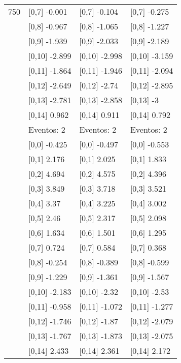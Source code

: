 \begin{table}
\begin{tabular}[t]{llll}
750 & {}[0,7] -0.001 & {}[0,7] -0.104 & {}[0,7] -0.275\\
\addlinespace
 & {}[0,8] -0.967 & {}[0,8] -1.065 & {}[0,8] -1.227\\
 & {}[0,9] -1.939 & {}[0,9] -2.033 & {}[0,9] -2.189\\
 & {}[0,10] -2.899 & {}[0,10] -2.998 & {}[0,10] -3.159\\
 & {}[0,11] -1.864 & {}[0,11] -1.946 & {}[0,11] -2.094\\
 & {}[0,12] -2.649 & {}[0,12] -2.74 & {}[0,12] -2.895\\
\addlinespace
 & {}[0,13] -2.781 & {}[0,13] -2.858 & {}[0,13] -3\\
 & {}[0,14] 0.962 & {}[0,14] 0.911 & {}[0,14] 0.792\\
 & Eventos:  2 & Eventos:  2 & Eventos:  2\\
 & {}[0,0] -0.425 & {}[0,0] -0.497 & {}[0,0] -0.553\\
 & {}[0,1] 2.176 & {}[0,1] 2.025 & {}[0,1] 1.833\\
\addlinespace
 & {}[0,2] 4.694 & {}[0,2] 4.575 & {}[0,2] 4.396\\
 & {}[0,3] 3.849 & {}[0,3] 3.718 & {}[0,3] 3.521\\
 & {}[0,4] 3.37 & {}[0,4] 3.225 & {}[0,4] 3.002\\
 & {}[0,5] 2.46 & {}[0,5] 2.317 & {}[0,5] 2.098\\
 & {}[0,6] 1.634 & {}[0,6] 1.501 & {}[0,6] 1.295\\
\addlinespace
1000 & {}[0,7] 0.724 & {}[0,7] 0.584 & {}[0,7] 0.368\\
 & {}[0,8] -0.254 & {}[0,8] -0.389 & {}[0,8] -0.599\\
 & {}[0,9] -1.229 & {}[0,9] -1.361 & {}[0,9] -1.567\\
 & {}[0,10] -2.183 & {}[0,10] -2.32 & {}[0,10] -2.53\\
 & {}[0,11] -0.958 & {}[0,11] -1.072 & {}[0,11] -1.277\\
\addlinespace
 & {}[0,12] -1.746 & {}[0,12] -1.87 & {}[0,12] -2.079\\
 & {}[0,13] -1.767 & {}[0,13] -1.873 & {}[0,13] -2.075\\
 & {}[0,14] 2.433 & {}[0,14] 2.361 & {}[0,14] 2.172\\
\bottomrule
\end{tabular}
\end{table}
